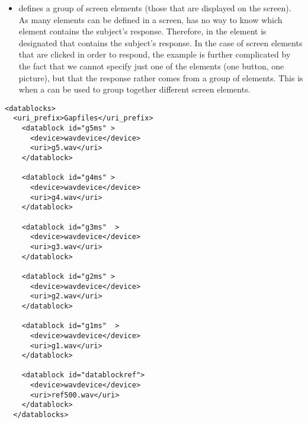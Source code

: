 \begin{itemize}
\begin{itemize}
\begin{itemize}
\end{itemize}

\item {} defines a group of screen elements
(those that are displayed on the screen). As many elements can be
defined in a screen, \apex has no way to know which element
contains the subject's response. Therefore, in
 the element is designated that
contains the subject's response. In the case of screen elements
that are clicked in order to respond, the example is further
complicated by the fact that we cannot specify just one of the
elements (one button, one picture), but that the response rather comes
from a group of elements. This is when a  can
be used to group together different screen elements.

\end{itemize}
\end{itemize}














\begin{lstlisting}
<datablocks>
  <uri_prefix>Gapfiles</uri_prefix>
    <datablock id="g5ms" >
      <device>wavdevice</device>
      <uri>g5.wav</uri>
    </datablock>

    <datablock id="g4ms" >
      <device>wavdevice</device>
      <uri>g4.wav</uri>
    </datablock>

    <datablock id="g3ms"  >
      <device>wavdevice</device>
      <uri>g3.wav</uri>
    </datablock>

    <datablock id="g2ms" >
      <device>wavdevice</device>
      <uri>g2.wav</uri>
    </datablock>

    <datablock id="g1ms"  >
      <device>wavdevice</device>
      <uri>g1.wav</uri>
    </datablock>

    <datablock id="datablockref">
      <device>wavdevice</device>
      <uri>ref500.wav</uri>
    </datablock>
  </datablocks>
\end{lstlisting}


